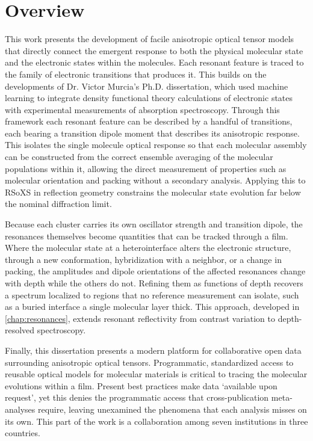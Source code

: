 \section{Overview}\label{sec:overview}

This work presents the development of facile anisotropic optical tensor models that directly connect the emergent response to both the physical molecular state and the electronic states within the molecules. Each resonant feature is traced to the family of electronic transitions that produces it. This builds on the developments of Dr. Victor Murcia's Ph.D. dissertation, which used machine learning to integrate density functional theory calculations of electronic states with experimental measurements of absorption spectroscopy.\autocite{murciaQuantitativeBondTraceableResonant2026} Through this framework each resonant feature can be described by a handful of transitions, each bearing a transition dipole moment that describes its anisotropic response. This isolates the single molecule optical response so that each molecular assembly can be constructed from the correct ensemble averaging of the molecular populations within it, allowing the direct measurement of properties such as molecular orientation and packing without a secondary analysis. Applying this to RSoXS in reflection geometry constrains the molecular state evolution far below the nominal diffraction limit.

Because each cluster carries its own oscillator strength and transition dipole, the resonances themselves become quantities that can be tracked through a film. Where the molecular state at a heterointerface alters the electronic structure, through a new conformation, hybridization with a neighbor, or a change in packing, the amplitudes and dipole orientations of the affected resonances change with depth while the others do not. Refining them as functions of depth recovers a spectrum localized to regions that no reference measurement can isolate, such as a buried interface a single molecular layer thick. This approach, developed in \cref{chap:resonances}, extends resonant reflectivity from contrast variation to depth-resolved spectroscopy.

Finally, this dissertation presents a modern platform for collaborative open data surrounding anisotropic optical tensors. Programmatic, standardized access to reusable optical models for molecular materials is critical to tracing the molecular evolutions within a film. Present best practices make data `available upon request', yet this denies the programmatic access that cross-publication meta-analyses require, leaving unexamined the phenomena that each analysis misses on its own. This part of the work is a collaboration among seven institutions in three countries.


